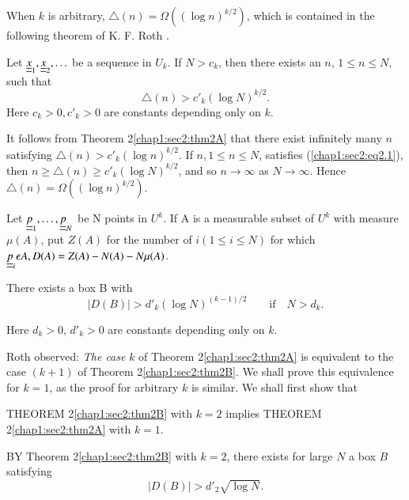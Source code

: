 When $k$ is arbitrary, $\triangle(n) = \Omega((\log n)^{k/2})$, which is contained in the following theorem of K. F. Roth \cite{19}.

\begin{theorem}\label{chap1:sec2:thm2A}
Let $\underline{\underline{x}}_{1}, \underline{\underline{x}}_{2}, \ldots$ be a sequence in $U_{k}$. If $N > c_{k}$, then there exists an $n$, $1 \leq n \leq N$, such that
\begin{equation*}
  \triangle(n) > c'_{k} (\log N)^{k/2} .\tag{2.1}\label{chap1:sec2:eq2.1}
\end{equation*}
Here $c_{k} > 0, c'_{k} > 0$
are constants depending only on $k$.
\end{theorem}

\begin{remark*}
It follows from Theorem 2\ref{chap1:sec2:thm2A} that there exist infinitely many $n$\pageoriginale satisfying $\triangle(n) > c'_{k} (\log n)^{k/2}$. If $n, 1 \leq n \leq N$, satisfies (\ref{chap1:sec2:eq2.1}), then $n \geq \triangle (n) \geq c'_{k} (\log N)^{k/2}$, and so $n \to \infty$ as $N \to \infty$. Hence $\triangle (n) = \Omega ((\log n)^{k/2})$.
\end{remark*}

Let $\underline{\underline{p}}_{1}, \ldots, \underline{\underline{p}}_{N}$ be N points in $U^{k}$. If A is a measurable subset of $U^{k}$ with measure $\mu (A)$, put $Z(A)$ for the number of $i(1 \leq i \leq N)$ for which $\underline{\underline{p}}_{i} \epsilon A, D(A) = Z(A) - N(A) - N \mu (A)$.

\begin{theorem}\label{chap1:sec2:thm2B}
 There exists a box B with
$$
|D(B)| > d'_{k} (\log N)^{(k - 1)/2} \qquad\text{if}\quad N > d_{k}.
$$
\end{theorem}

Here $d_{k} > 0$, $d'_{k} > 0$ are constants depending only on $k$.

Roth observed: {\em The case} $k$ of Theorem 2\ref{chap1:sec2:thm2A} is equivalent to the case $(k+1 )$ of Theorem 2\ref{chap1:sec2:thm2B}. We shall prove this equivalence for $k = 1$, as the proof for arbitrary $k$ is similar. We shall first show that

THEOREM 2\ref{chap1:sec2:thm2B} with $k = 2$ implies THEOREM 2\ref{chap1:sec2:thm2A} with $k = 1$.

BY Theorem 2\ref{chap1:sec2:thm2B} with $k = 2$, there exists for large $N$ a box $B$ satisfying
\begin{equation*}
  |D(B)| > d'_{2} \sqrt{\log N}.\tag{2.2}\label{chap1:sec2:eq2.2}
\end{equation*}

